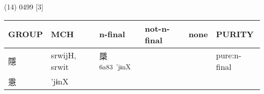 \documentclass[14pt,a4paper]{scrartcl}
\begin{document}
(14) 0499 {[}3{]}

\begin{longtable}[c]{@{}llllll@{}}
\toprule
\begin{minipage}[b]{0.14\columnwidth}\raggedright\strut
GROUP
\strut\end{minipage} &
\begin{minipage}[b]{0.14\columnwidth}\raggedright\strut
MCH
\strut\end{minipage} &
\begin{minipage}[b]{0.14\columnwidth}\raggedright\strut
n-final
\strut\end{minipage} &
\begin{minipage}[b]{0.14\columnwidth}\raggedright\strut
not-n-final
\strut\end{minipage} &
\begin{minipage}[b]{0.14\columnwidth}\raggedright\strut
none
\strut\end{minipage} &
\begin{minipage}[b]{0.14\columnwidth}\raggedright\strut
PURITY
\strut\end{minipage}\tabularnewline
\midrule
\endhead
\begin{minipage}[t]{0.14\columnwidth}\raggedright\strut
隱
\strut\end{minipage} &
\begin{minipage}[t]{0.14\columnwidth}\raggedright\strut
srwijH, srwit
\strut\end{minipage} &
\begin{minipage}[t]{0.14\columnwidth}\raggedright\strut
檃\textsuperscript{6a83~'jɨnX}
\strut\end{minipage} &
\begin{minipage}[t]{0.14\columnwidth}\raggedright\strut
\strut\end{minipage} &
\begin{minipage}[t]{0.14\columnwidth}\raggedright\strut
\strut\end{minipage} &
\begin{minipage}[t]{0.14\columnwidth}\raggedright\strut
pure:n-final
\strut\end{minipage}\tabularnewline
\begin{minipage}[t]{0.14\columnwidth}\raggedright\strut
㥯
\strut\end{minipage} &
\begin{minipage}[t]{0.14\columnwidth}\raggedright\strut
'jɨnX
\strut\end{minipage} &
\begin{minipage}[t]{0.14\columnwidth}\raggedright\strut

\end{minipage}
\end{longtable}
\end{document}
